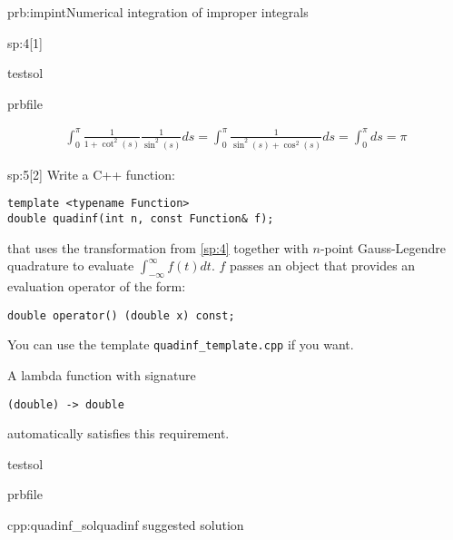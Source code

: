 \begin{samproblem}{prb:impint}{Numerical integration of improper integrals}
\begin{subproblem}{sp:4}[1]
  \begin{samwriteprbpart}{testsol}
    \begin{writeverbatim}{prbfile}
      \begin{samsolution}
        \begin{align}
          \int_0^\pi \frac{1}{1 + \cot^2(s)} \frac{1}{\sin^2(s)} ds = \int_0^\pi \frac{1}{\sin^2(s) + \cos^2(s)} ds = \int_0^\pi ds = \pi
        \end{align}
      \end{samsolution}
    \end{writeverbatim}
  \end{samwriteprbpart}

\end{subproblem}

\begin{subproblem}{sp:5}[2] 
  Write a C++ function:
  \begin{lstlisting}[style=cpp]
template <typename Function>
double quadinf(int n, const Function& f);
  \end{lstlisting}
  that uses the transformation from \ref{sp:4} together with $n$-point Gauss-Legendre quadrature to evaluate $\int_{-\infty}^{\infty} f(t) dt$. 
  $f$ passes an object that provides an evaluation operator of the form:
  \begin{lstlisting}
double operator() (double x) const;
  \end{lstlisting}

  \begin{samhint}
    You can use the template \verb|quadinf_template.cpp| if you want.
  \end{samhint}

  \begin{samhint}
    A lambda function with signature
    \begin{lstlisting}[style=cpp]
(double) -> double
    \end{lstlisting}
    automatically satisfies this requirement.
  \end{samhint}

  \begin{samwriteprbpart}{testsol}
    \begin{writeverbatim}{prbfile}
      \begin{samsolution}
        \begin{samcode}[C++-code]{cpp:quadinf_sol}{quadinf suggested solution}
          \small
          
        \end{samcode}
      \end{samsolution}
    \end{writeverbatim}
  \end{samwriteprbpart}


\end{subproblem}
\end{samproblem}
